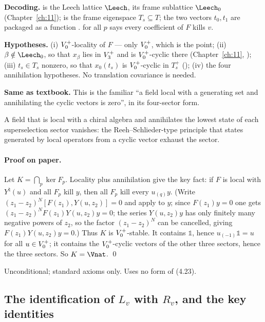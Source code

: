 \begin{dictionary}
\textbf{Decoding.}   is the Leech lattice $\Leech$,  its
frame sublattice $\Leech_0$ (Chapter~\ref{ch:11});  is the frame eigenspace
$T_s\subseteq T$; the two vectors $t_0,t_1$ are packaged as a function .
 for all $p$ says every coefficient of $F$ kills $v$.

\textbf{Hypotheses.}  (i) $V_0^{+}$-locality of $F$ — only $V_0^{+}$, which is the point; (ii)
$\beta\notin\Leech_0$, so that $x_\beta$ lies in $V_3^{+}$ and is $V_0^{+}$-cyclic there (Chapter~\ref{ch:11},
); (iii) $t_s\in T_s$ nonzero, so that $x_0(t_s)$ is $V_0^{+}$-cyclic in $T_s^+$
(); (iv) the four annihilation hypotheses.  No translation covariance is needed.

\textbf{Same as textbook.}  This is the familiar ``a field local with a generating set and
annihilating the cyclic vectors is zero'', in its four-sector form.
\end{dictionary}
\begin{physics}
A field that is local with a chiral algebra and annihilates the lowest state of each superselection sector vanishes: the Reeh--Schlieder-type principle that states generated by local operators from a cyclic vector exhaust the sector.
\end{physics}


\paragraph{Proof on paper.}  Let $K=\bigcap_p\ker F_p$.  Locality plus annihilation give the
key fact: if $F$ is local with $Y^\natural(u)$ and all $F_p$ kill $y$, then all $F_p$ kill every
$u_{(q)}y$.  (Write $(z_1-z_2)^N[F(z_1),Y(u,z_2)]=0$ and apply to $y$; since $F(z_1)y=0$ one gets
$(z_1-z_2)^NF(z_1)Y(u,z_2)y=0$; the series $Y(u,z_2)y$ has only finitely many negative powers of
$z_2$, so the factor $(z_1-z_2)^N$ can be cancelled, giving $F(z_1)Y(u,z_2)y=0$.)  Thus $K$ is
$V_0^{+}$-stable.  It contains $\mathbb 1$, hence $u_{(-1)}\mathbb 1=u$ for all $u\in V_0^{+}$; it
contains the $V_0^{+}$-cyclic vectors of the other three sectors, hence the three sectors.  So
$K=\Vnat$. \qed

\begin{status}Unconditional; standard axioms only.  Uses no form of (4.23).\end{status}

\subsection{\texorpdfstring{The identification of $L_v$ with $R_v$, and the key identities}{The identification of L_v with R_v, and the key identities}}

